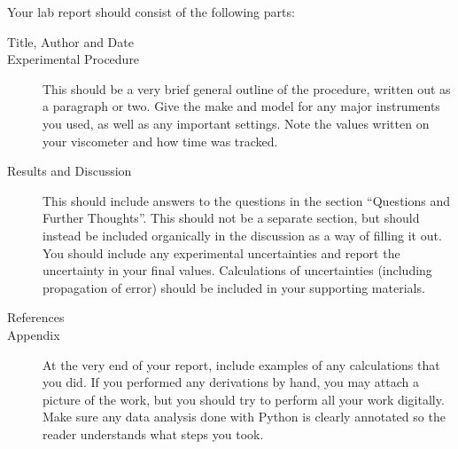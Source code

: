 Your lab report should consist of the following parts:
\begin{description}
	\item[Title, Author and Date]
	\item[Experimental Procedure] This should be a very brief general outline of the procedure, written out as a paragraph or two. Give the make and model for any major instruments you used, as well as any important settings. Note the values written on your viscometer and how time was tracked. 
	\item[Results and Discussion] This should include answers to the questions in the section ``Questions and Further Thoughts''. This should not be a separate section, but should instead be included organically in the discussion as a way of filling it out. You should include any experimental uncertainties and report the uncertainty in your final values. Calculations of uncertainties (including propagation of error) should be included in your supporting materials. 
	\item[References]
	\item[Appendix] At the very end of your report, include examples of any calculations that you did. If you performed any derivations by hand, you may attach a picture of the work, but you should try to perform all your work digitally. 
	Make sure any data analysis done with Python is clearly annotated so the reader understands what steps you took. 
\end{description}
